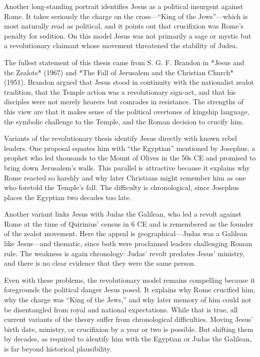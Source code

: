 Another long-standing portrait identifies Jesus as a political insurgent against Rome.
It takes seriously the charge on the cross—“King of the Jews”—which is most naturally read as political, and it points out that crucifixion was Rome’s penalty for sedition.
On this model Jesus was not primarily a sage or mystic but a revolutionary claimant whose movement threatened the stability of Judea.

The fullest statement of this thesis came from S. G. F. Brandon in *Jesus and the Zealots* (1967) and *The Fall of Jerusalem and the Christian Church* (1951).
Brandon argued that Jesus stood in continuity with the nationalist zealot tradition, that the Temple action was a revolutionary sign-act, and that his disciples were not merely hearers but comrades in resistance.
The strengths of this view are that it makes sense of the political overtones of kingship language, the symbolic challenge to the Temple, and the Roman decision to crucify him.

Variants of the revolutionary thesis identify Jesus directly with known rebel leaders.
One proposal equates him with “the Egyptian” mentioned by Josephus, a prophet who led thousands to the Mount of Olives in the 50s CE and promised to bring down Jerusalem’s walls.
This parallel is attractive because it explains why Rome reacted so harshly and why later Christians might remember him as one who foretold the Temple’s fall.
The difficulty is chronological, since Josephus places the Egyptian two decades too late.

Another variant links Jesus with Judas the Galilean, who led a revolt against Rome at the time of Quirinius’ census in 6 CE and is remembered as the founder of the zealot movement.
Here the appeal is geographical—Judas was a Galilean like Jesus—and thematic, since both were proclaimed leaders challenging Roman rule.
The weakness is again chronology: Judas’ revolt predates Jesus’ ministry, and there is no clear evidence that they were the same person.

Even with these problems, the revolutionary model remains compelling because it foregrounds the political danger Jesus posed.
It explains why Rome crucified him, why the charge was “King of the Jews,” and why later memory of him could not be disentangled from royal and national expectations.
While that is true, all current variants of the theory suffer from chronological difficulties.
Moving Jesus’ birth date, ministry, or crucifixion by a year or two is possible.
But shifting them by decades, as required to identify him with the Egyptian or Judas the Galilean, is far beyond historical plausibility.

